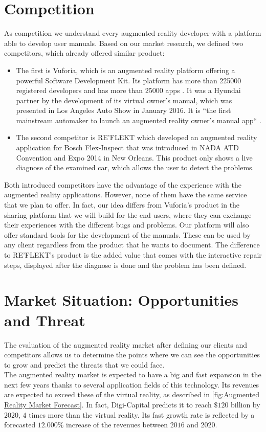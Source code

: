 \section{Competition}
	As competition we understand every augmented reality developer with a platform able to develop user manuals. Based on our market research, we defined two competitors, which already offered similar product:
	
\begin{itemize}
	\item The first is Vuforia, which is an augmented reality platform offering a powerful Software Development Kit. Its platform has more than 225000 registered developers and has more than 25000 apps \footnotemark. 
It was a Hyundai partner by the development of its virtual owner’s manual, which was presented in Los Angeles Auto Show in January 2016. It is “the first mainstream automaker to launch an augmented reality owner’s manual app“ \footnotemark. 
	\item The second competitor is RE’FLEKT which developed an augmented reality application for Bosch Flex-Inspect that was introduced in NADA ATD Convention and Expo 2014 in New Orleans. This product only shows a live diagnose of the examined car, which allows the user to detect the problems. 
\end{itemize}

	 Both introduced competitors have the advantage of the experience with the augmented reality applications. However, none of them have the same service that we plan to offer. In fact, our idea differs from Vuforia’s product in the sharing platform that we will build for the end users, where they can exchange their experiences with the different bugs and problems. Our platform will also offer standard tools for the development of the manuals. These can be used by any client regardless from the product that he wants to document. The difference to RE’FLEKT’s product is the added value that comes with the interactive repair steps, displayed after the diagnose is done and the problem has been defined. 
	 
\section{Market Situation: Opportunities and Threat}
The evaluation of the augmented reality market after defining our clients and competitors allows us to determine the points where we can see the opportunities to grow and predict the threats that we could face.
\\
	The augmented reality market is expected to have a big and fast expansion in the next few years thanks to several application fields of this technology. Its revenues are expected to exceed these of the virtual reality, as described in \autoref{fig:Augmented Reality Market Forecast}. In fact, Digi-Capital predicts it to reach $ \$120 $ billion by $2020$, $4$ times more than the virtual reality. Its fast growth rate is reflected by a forecasted $12.000\%$ increase of the revenues between $2016$ and $2020$. 
	
